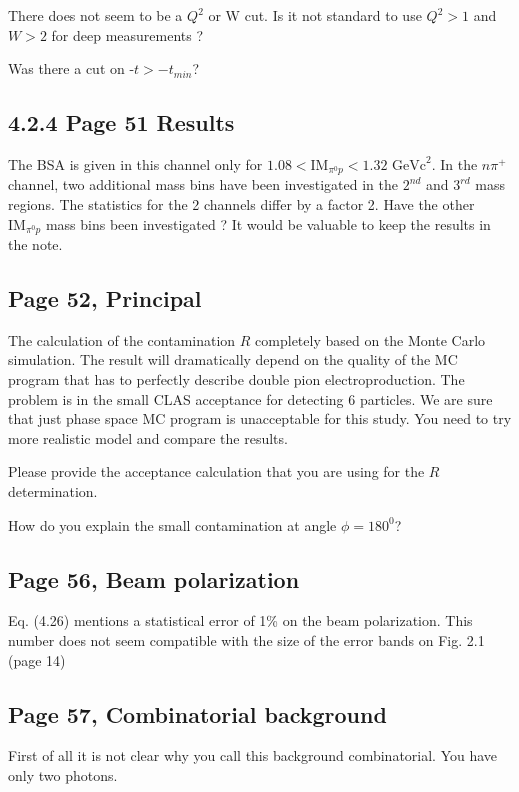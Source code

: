 \documentclass[11pt]{paper}
\begin{document}
There does not seem to be a $Q^2$ or W cut. Is it not standard to use $Q^2>1$ and $W>2$ for deep measurements ?

Was there a cut on -$t > -t_{min} $?

\subsection*{4.2.4 Page 51 Results}

The BSA is given in this channel only for $1.08 < \mbox{IM}_{\pi^0p}<1.32\mbox{ GeVc}^2$. 
In the $n\pi^+$ channel, two additional mass bins have been investigated in the $2^{nd}$ and $3^{rd}$ mass regions.
The statistics for the 2 channels differ by a factor 2.
Have the other $\mbox{IM}_{\pi^0p}$ mass bins been investigated ?
It would be valuable to keep the results in the note.

\subsection*{Page 52, Principal}

The calculation of the contamination $R$ completely based on the Monte Carlo simulation.
The result will dramatically depend on the quality of the MC program that has to perfectly describe
double pion electroproduction. The problem is in the small CLAS acceptance for detecting 6 particles.
We are sure that just phase space MC program is unacceptable for this study.
You need to try more realistic model and compare the results.

Please provide the acceptance calculation that you are using for the $R$ determination.

How do you explain the small contamination at angle $\phi=180^0$?

\subsection*{Page 56, Beam polarization}

Eq. (4.26) mentions a statistical error of 1\% on the beam polarization.
This number does not seem compatible with the size of the error bands on Fig. 2.1 (page 14)

\subsection*{Page 57, Combinatorial background}

First of all it is not clear why you call this background combinatorial. You have only two photons.
\end{document}
